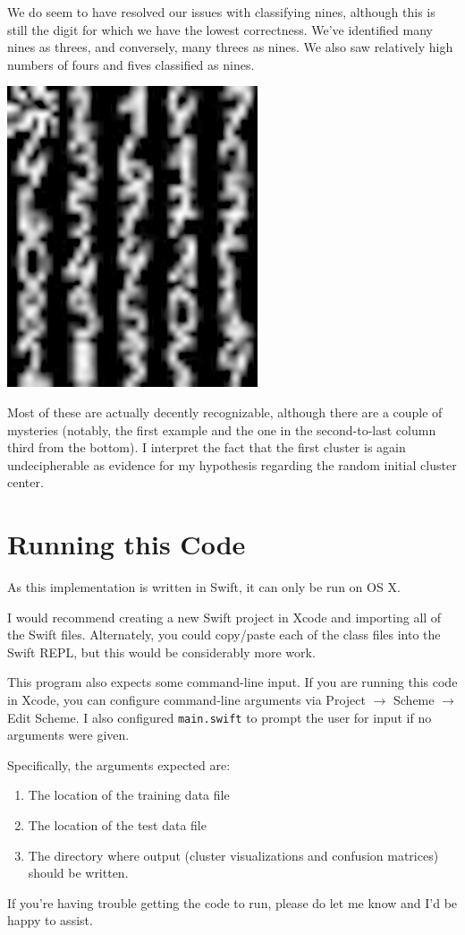 \documentclass[11pt, oneside]{article}    %
\begin{document}
We do seem to have resolved our issues with classifying nines, although this is still the digit for which we have the lowest correctness. We've identified many nines as threes, and conversely, many threes as nines. We also saw relatively high numbers of fours and fives classified as nines.

\begin{center}
	\includegraphics{Exp2Visualizations}
\end{center}

Most of these are actually decently recognizable, although there are a couple of mysteries (notably, the first example and the one in the second-to-last column third from the bottom). I interpret the fact that the first cluster is again undecipherable as evidence for my hypothesis regarding the random initial cluster center.

\section{Running this Code}

As this implementation is written in Swift, it can only be run on OS X.

I would recommend creating a new Swift project in Xcode and importing all of the Swift files. Alternately, you could copy/paste each of the class files into the Swift REPL, but this would be considerably more work.

This program also expects some command-line input. If you are running this code in Xcode, you can configure command-line arguments via Project $\rightarrow$ Scheme $\rightarrow$ Edit Scheme. I also configured \texttt{main.swift} to prompt the user for input if no arguments were given.

Specifically, the arguments expected are:
\begin{enumerate}
	\item The location of the training data file
	\item The location of the test data file
	\item The directory where output (cluster visualizations and confusion matrices) should be written.
\end{enumerate}

If you're having trouble getting the code to run, please do let me know and I'd be happy to assist.
\end{document}
